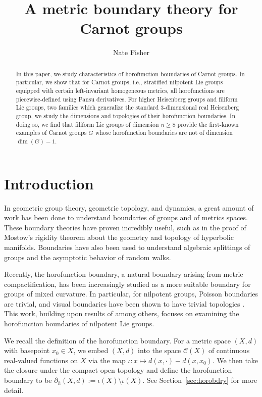 \documentclass{article}
\title{A metric boundary theory for Carnot groups}
\author{Nate Fisher}
\date{}
\theoremstyle{definition}
\newcommand{\bhor}{\partial_h}
\begin{document}
\maketitle
\large

\begin{abstract}
In this paper, we study characteristics of horofunction boundaries of Carnot groups. In particular, we show that for Carnot groups, i.e., stratified nilpotent Lie groups equipped with certain left-invariant homogeneous metrics, all horofunctions are piecewise-defined using Pansu derivatives. For higher Heisenberg groups and filiform Lie groups, two families which generalize the standard 3-dimensional real Heisenberg group, we study the dimensions and topologies of their horofunction boundaries. In doing so, we find that filiform Lie groups of dimension $n\geq 8$ provide the first-known examples of Carnot groups $G$ whose horofunction boundaries are not of dimension $\dim(G) - 1$.
\end{abstract}




\section{Introduction}

In geometric group theory, geometric topology, and dynamics, a great amount of work has been done to understand boundaries of groups and of metrics spaces. These boundary theories have proven incredibly useful, such as in the proof of Mostow's rigidity theorem about the geometry and topology of hyperbolic manifolds. Boundaries have also been used to understand algebraic splittings of groups and the asymptotic behavior of random walks.

Recently, the horofunction boundary,  a natural boundary arising from metric compactification, has been increasingly studied as a more suitable boundary for groups of mixed curvature. In particular, for nilpotent groups, Poisson boundaries are trivial, and visual boundaries have been shown to have trivial topologies \cite{DM61, azencott, DF-stars}. This work, building upon results of \cite{KN-cc, asympt-horobdry, FNG} among others, focuses on examining the horofunction boundaries of nilpotent Lie groups.

We recall the definition of the horofunction boundary. For a metric space $(X,d)$ with basepoint $x_0 \in X$, we embed $(X,d)$ into the space $\mathcal C(X)$ of continuous real-valued functions on $X$ via the map $\iota: x\mapsto d(x,\cdot) - d(x, x_0)$. We then take the closure under the compact-open topology and define the horofunction boundary to be $\bhor(X, d) := \overline{\iota(X)}\setminus \iota(X)$. See Section~\ref{sec:horobdry} for more detail.
\end{document}
